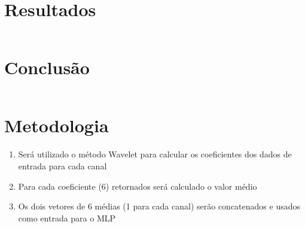 \documentclass[11pt]{article}
\makeatletter
\providecommand{\tightlist}{%
      \setlength{\itemsep}{0pt}\setlength{\parskip}{0pt}}
\newcommand{\boxspacing}{\kern\kvtcb@left@rule\kern\kvtcb@boxsep}
\newcommand{\prompt}[4]{
        {\ttfamily\llap{{\color{#2}[#3]:\hspace{3pt}#4}}\vspace{-\baselineskip}}
    }
\makeatother
\begin{document}
    \hypertarget{resultados}{%
\section{Resultados}\label{resultados}}

    \begin{tcolorbox}[breakable, size=fbox, boxrule=1pt, pad at break*=1mm,colback=cellbackground, colframe=cellborder]
\prompt{In}{incolor}{ }{\boxspacing}
\begin{Verbatim}[commandchars=\\\{\}]

\end{Verbatim}
\end{tcolorbox}

    \hypertarget{conclusuxe3o}{%
\section{Conclusão}\label{conclusuxe3o}}

    \begin{tcolorbox}[breakable, size=fbox, boxrule=1pt, pad at break*=1mm,colback=cellbackground, colframe=cellborder]
\prompt{In}{incolor}{ }{\boxspacing}
\begin{Verbatim}[commandchars=\\\{\}]

\end{Verbatim}
\end{tcolorbox}

    \hypertarget{metodologia}{%
\section{Metodologia}\label{metodologia}}

    \begin{enumerate}
\def\labelenumi{\arabic{enumi}.}
\tightlist
\item
  Será utilizado o método Wavelet para calcular os coeficientes dos
  dados de entrada para cada canal
\item
  Para cada coeficiente (6) retornados será calculado o valor médio
\item
  Os dois vetores de 6 médias (1 para cada canal) serão concatenados e
  usados como entrada para o MLP
\end{enumerate}
\end{document}

